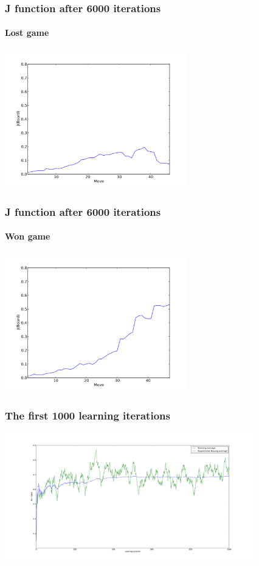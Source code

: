 \documentclass[10pt]{beamer}
\begin{document}
\begin{frame}
  \frametitle{J function after 6000 iterations}
  \framesubtitle{Lost game}
  \begin{center} \includegraphics[height=6cm]{Graphs/J_6000iterations_lost.pdf} \end{center}
\end{frame}

\begin{frame}
  \frametitle{J function after 6000 iterations}
  \framesubtitle{Won game}
  \begin{center} \includegraphics[height=6cm]{Graphs/J_6000iterations_win.pdf} \end{center}
\end{frame}

\begin{frame}
  \frametitle{The first 1000 learning iterations}
  \begin{center} \includegraphics[trim= 6cm 2cm 2cm 2cm, clip, height=5.6cm]{Graphs/Learning_2ply_First1000.pdf} \end{center}
\end{frame}
\end{document}
